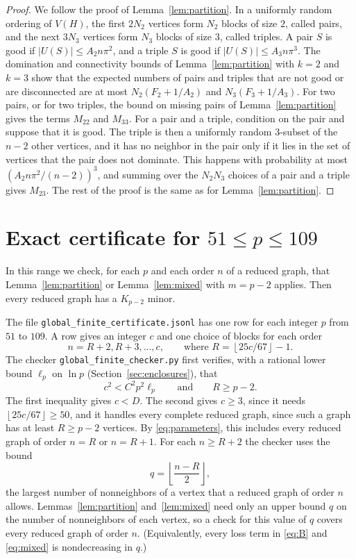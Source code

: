 \documentclass[11pt]{article}
\newcommand{\floor}[1]{\left\lfloor#1\right\rfloor}
\begin{document}
\begin{proof}
We follow the proof of Lemma~\ref{lem:partition}. In a uniformly random
ordering of $V(H)$, the first $2N_2$ vertices form $N_2$ blocks of size $2$,
called pairs, and the next $3N_3$ vertices form $N_3$ blocks of size $3$,
called triples. A pair $S$ is good if $|U(S)|\le A_2n\pi^2$, and a triple
$S$ is good if $|U(S)|\le A_3n\pi^3$. The domination and connectivity bounds of
Lemma~\ref{lem:partition} with $k=2$ and $k=3$ show that the expected
numbers of pairs and triples that are not good or are disconnected are at
most $N_2(F_2+1/A_2)$ and $N_3(F_3+1/A_3)$. For two pairs, or for two
triples, the bound on missing pairs of Lemma~\ref{lem:partition} gives the
terms $M_{22}$ and $M_{33}$. For a pair and a triple, condition on the pair
and suppose that it is good. The triple is then a uniformly random
$3$-subset of the $n-2$ other vertices, and it has no neighbor in the pair
only if it lies in the set of vertices that the pair does not dominate. This
happens with probability at most $(A_2n\pi^2/(n-2))^3$, and summing over the
$N_2N_3$ choices of a pair and a triple gives $M_{23}$. The rest of the proof
is the same as for Lemma~\ref{lem:partition}.
\end{proof}

\section{Exact certificate for \texorpdfstring{$51\le p\le109$}{51 <= p <= 109}}\label{sec:finite}

In this range we check, for each $p$ and each order $n$ of a reduced graph,
that Lemma~\ref{lem:partition} or Lemma~\ref{lem:mixed} with $m=p-2$ applies.
Then every reduced graph has a $K_{p-2}$ minor.

The file \texttt{global\_finite\_certificate.jsonl} has one row for each
integer $p$ from $51$ to $109$. A row gives an integer $c$ and one choice of
blocks for each order
\begin{equation*}
 n=R+2,R+3,\ldots,c,\qquad\text{where }R=\floor{25c/67}-1.
\end{equation*}
The checker \texttt{global\_finite\_checker.py} first verifies, with a
rational lower bound $\ell_p$ on $\ln p$ (Section~\ref{sec:enclosures}), that
\begin{equation*}
 c^2<C^2p^2\ell_p\qquad\text{and}\qquad R\ge p-2.
\end{equation*}
The first inequality gives $c<D$. The second gives $c\ge3$, since it needs
$\floor{25c/67}\ge50$, and it handles
every complete reduced graph, since such a graph has at least $R\ge p-2$
vertices. By \eqref{eq:parameters}, this includes every reduced graph of
order $n=R$ or $n=R+1$. For each $n\ge R+2$ the checker uses the bound
\begin{equation*}
 q=\floor{\frac{n-R}{2}},
\end{equation*}
the largest number of nonneighbors of a vertex that a reduced graph of order
$n$ allows.
Lemmas~\ref{lem:partition} and~\ref{lem:mixed} need only an upper bound $q$
on the number of nonneighbors of each vertex, so a check for this value of
$q$ covers every reduced graph of order $n$. (Equivalently, every loss term
in \eqref{eq:B} and \eqref{eq:mixed} is nondecreasing in $q$.)
\end{document}
